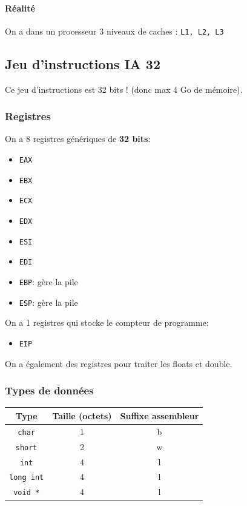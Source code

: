 \paragraph{Réalité}\label{ruxe9alituxe9}

On a dans un processeur 3 niveaux de caches : \texttt{L1,\ L2,\ L3}

\subsection{Jeu d'instructions IA 32}\label{jeu-dinstructions-ia-32}

Ce jeu d'instructions est 32 bits ! (donc max 4 Go de mémoire).

\subsubsection{Registres}\label{registres}

On a 8 registres génériques de \textbf{32 bits}:

\begin{itemize}
\tightlist
\item
  \texttt{EAX}
\item
  \texttt{EBX}
\item
  \texttt{ECX}
\item
  \texttt{EDX}
\item
  \texttt{ESI}
\item
  \texttt{EDI}
\item
  \texttt{EBP}: gère la pile
\item
  \texttt{ESP}: gère la pile
\end{itemize}

On a 1 registres qui stocke le compteur de programme:

\begin{itemize}
\tightlist
\item
  \texttt{EIP}
\end{itemize}

On a également des registres pour traiter les floats et double.

\subsubsection{Types de données}\label{types-de-donnuxe9es}

\begin{longtable}[]{@{}ccc@{}}
\toprule\noalign{}
Type & Taille (octets) & Suffixe assembleur \\
\midrule\noalign{}
\endhead
\bottomrule\noalign{}
\endlastfoot
\texttt{char} & 1 & b \\
\texttt{short} & 2 & w \\
\texttt{int} & 4 & l \\
\texttt{long\ int} & 4 & l \\
\texttt{void\ *} & 4 & l \\
\end{longtable}

